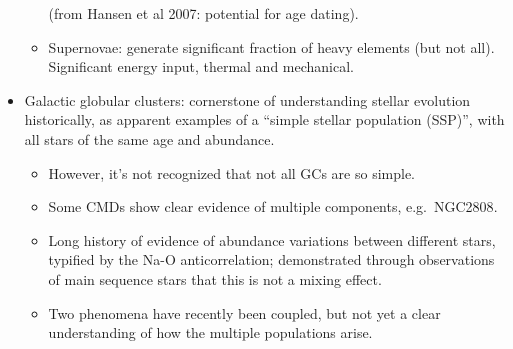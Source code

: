 \documentclass{article}
\begin{document}
\begin{itemize}
\begin{itemize}
                (from {Hansen et al 2007}: potential for
                age dating).
            \item Supernovae: generate significant fraction of heavy elements
                (but not all). Significant energy input, thermal and mechanical.
        \end{itemize}
    \item Galactic globular clusters: cornerstone of understanding
      stellar evolution historically, as apparent examples of a
      ``simple stellar population (SSP)'', with all stars of the same
      age and abundance.
      \begin{itemize}
          \item However, it's not recognized that not all GCs are so simple.
          \item Some CMDs show clear evidence of multiple components, e.g.\
              {NGC2808}.
          \item Long history of evidence of abundance variations between
              different stars, typified by the Na-O anticorrelation;
              demonstrated through observations of main sequence stars that
              this is not a mixing effect.
          \item Two phenomena have recently been coupled, but not yet a clear
              understanding of how the multiple populations arise.
      \end{itemize}
  \end{itemize}
\end{document}
